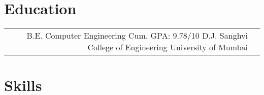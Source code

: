 \documentclass[10pt]{article} %
\begin{document}
\begin{paracol}{2}

\section{Education} 





\begin{supertabular}{rl} %

	
	{B.E. Computer Engineering} %
	{Cum. GPA: 9.78/10} %
	{D.J. Sanghvi College of Engineering} %
	{University of Mumbai} %
	

\end{supertabular}


\section{Skills} 






\end{paracol}
\end{document}
